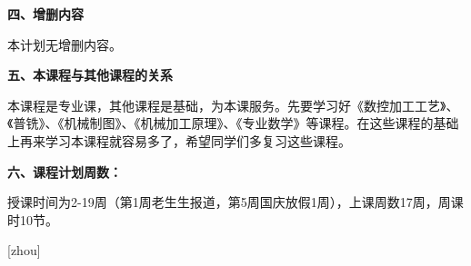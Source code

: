 \documentclass{ctexart}
\begin{document}
\textbf{四、增删内容}

本计划无增删内容。

\textbf{五、本课程与其他课程的关系}

本课程是专业课，其他课程是基础，为本课服务。先要学习好《数控加工工艺》、《普铣》、《机械制图》、《机械加工原理》、《专业数学》等课程。在这些课程的基础上再来学习本课程就容易多了，希望同学们多复习这些课程。

\textbf{六、课程计划周数：}

授课时间为2-19周（第1周老生生报道，第5周国庆放假1周），上课周数17周，周课时10节。

\onecolumn \setlength{\parindent}{0em}

\setcounter{lilunN}{0} %

\newcommand{\llh}{ \stepcounter{lilunN} 理论\arabic{lilunN}、} %
\newcommand{\syt}{ 自绘示意图\arabic{lilunN} }%
\newcommand{\xt}{ 习题\arabic{lilunN} }%

 \setcounter{zhou}{0}%
 [zhou] \setcounter{ci}{0}%
\newcommand{\zc}{\ifthenelse{ \not \isodd{\value{ci}}}{\stepcounter{zhou}\setcounter{ci}{0}}{} \stepcounter{ci} \arabic{zhou}/\arabic{ci}} %
\newcommand{\zcd}{\stepcounter{zhou} \arabic{zhou}} %
\end{document}
